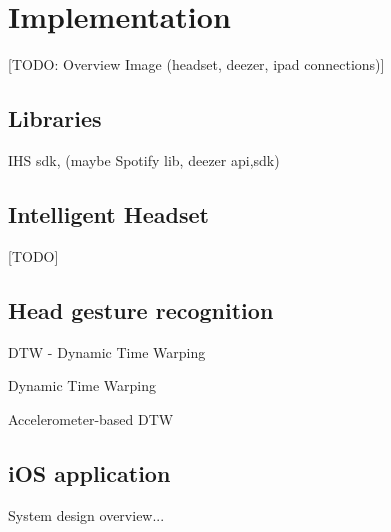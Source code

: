\chapter{Implementation}

[TODO: Overview Image (headset, deezer, ipad connections)]




\section{Libraries}
IHS sdk, (maybe Spotify lib, deezer api,sdk)


\section{Intelligent Headset}
[TODO]


\section{Head gesture recognition}
DTW - Dynamic Time Warping 

Dynamic Time Warping \cite{salvador_toward_2007}

Accelerometer-based DTW \cite{akl_accelerometer-based_2010}


\section{iOS application}
System design overview...




